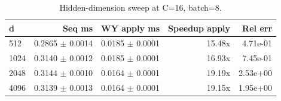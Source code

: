 \begin{table}[t]
  \centering
  \caption{Hidden-dimension sweep at C=16, batch=8.}
  \label{tab:sweep-d}
  \begin{tabular}{lrrrr}
    \hline
    d & Seq ms & WY apply ms & Speedup apply & Rel err \\
    \hline
    512 & 0.2865 $\pm$ 0.0014 & 0.0185 $\pm$ 0.0001 & 15.48x & 4.71e-01 \\
    1024 & 0.3140 $\pm$ 0.0012 & 0.0185 $\pm$ 0.0001 & 16.93x & 7.45e-01 \\
    2048 & 0.3144 $\pm$ 0.0010 & 0.0164 $\pm$ 0.0001 & 19.19x & 2.53e+00 \\
    4096 & 0.3139 $\pm$ 0.0013 & 0.0164 $\pm$ 0.0001 & 19.15x & 1.95e+00 \\
    \hline
  \end{tabular}
\end{table}
